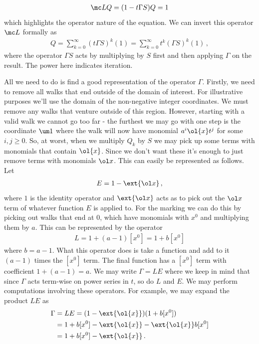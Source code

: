 \begin{align}
	\mc L Q = (1-t\Gamma S)Q = 1
\end{align}
which highlights the operator nature of the equation. We can invert this operator $\mc L$ formally as
\begin{align}
	Q = \sum_{k=0}^\infty (t\Gamma S)^k(1) =   \sum_{k=0}^\infty t^k(\Gamma S)^k(1) \,,
\end{align}
where the operator $\Gamma S$ acts by multiplying by $S$ first and then applying $\Gamma$ on the result. The power here indicates iteration.

All we need to do is find a good representation of the operator $\Gamma$. Firstly, we need to remove all walks that end outside of the domain of interest. For illustrative purposes we'll use the domain of the non-negative integer coordinates. We must remove any walks that venture outside of this region. However, starting with a valid walk we cannot go too far - the furthest we may go with one step is the coordinate $\um 1$ where the walk will now have monomial $a^i \ol{x} t^j$ for some $i,j\ge 0$. So, at worst, when we multiply $Q_k$ by $S$ we may pick up some terms with monomials that contain $\ol{x}$. Since we don't want these it's enough to just remove terms with monomials $\ol x$. This can easily be represented as follows. Let
\begin{align}
	E = 1 - \ext{\ol x}\,,
\end{align}
where $1$ is the identity operator and $\ext{\ol x}$ acts as to pick out the $\ol x$ term of whatever function $E$ is applied to. For the marking we can do this by picking out walks that end at 0, which have monomials with $x^0$ and multiplying them by $a$. This can be represented by the operator
\begin{align}
	L = 1 + (a-1) [x^0] = 1 + b[x^0]
\end{align}
where $b = a-1$. What this operator does is take a function and add to it $(a-1)$ times the $[x^0]$ term. The final function has a $[x^0]$ term with coefficient $1 + (a-1) = a$. We may write $\Gamma = LE$ where we keep in mind that since $\Gamma$ acts term-wise on power series in $t$, so do $L$ and $E$. We may perform computations involving these operators. For example, we may expand the product $LE$ as
\begin{align}
\begin{split}
	\Gamma &= LE = (1 - \ext{\ol{x}})(1 + b[x^0]) \\
	&= 1 + b[x^0] - \ext{\ol{x}}-\ext{\ol{x}}b[x^0]\\
	&=1 + b[x^0] -\ext{\ol{x}}\,.
\end{split}
\end{align}
